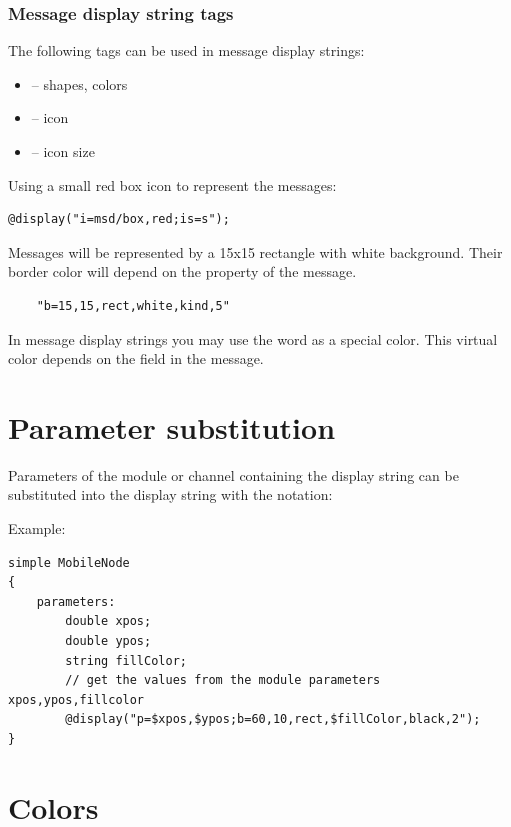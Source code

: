 \subsubsection{Message display string tags}

The following tags can be used in message display strings:
\begin{itemize}
  \item{ -- shapes, colors}
  \item{ -- icon}
  \item{ -- icon size}
\end{itemize}

Using a small red box icon to represent the messages:
\begin{verbatim}
@display("i=msd/box,red;is=s");
\end{verbatim}

Messages will be represented by a 15x15 rectangle with white background.
Their border color will depend on the  property of the message.
\begin{verbatim}
    "b=15,15,rect,white,kind,5"
\end{verbatim}

\begin{note}
   In message display strings you may use the word  as a special color. 
   This virtual color depends on the  field in the message.
\end{note}



\section{Parameter substitution}

Parameters of the module or channel containing the
display string can be substituted into the display string
with the  notation:

Example:
\begin{verbatim}
simple MobileNode
{
    parameters:
        double xpos;
        double ypos;
        string fillColor;
        // get the values from the module parameters xpos,ypos,fillcolor
        @display("p=$xpos,$ypos;b=60,10,rect,$fillColor,black,2");
}
\end{verbatim}

\section{Colors}
\label{sec:ch-graphics:colors}

